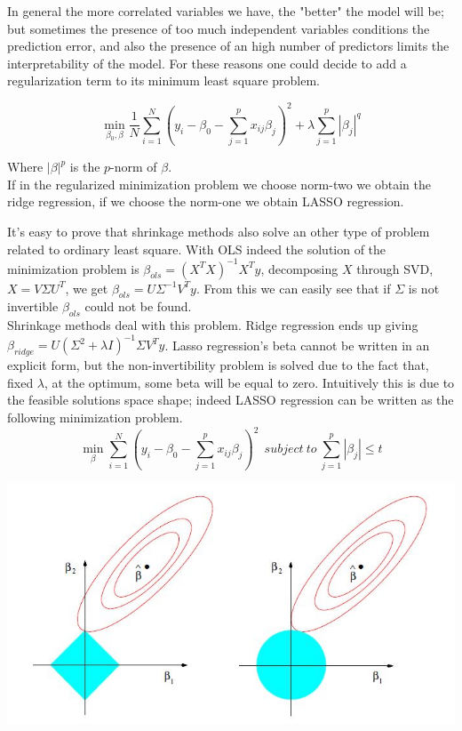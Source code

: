 \documentclass{article}%
\begin{document}
In general the more correlated variables we have, the "better" the model will be; but sometimes the presence of too much independent variables conditions the prediction error, and also the presence of an high number of predictors limits the interpretability of the model. For these reasons one could decide to add a regularization term to its minimum least square problem.

\[
\min_{\beta_0 , \beta} \frac{1}{N} \sum_{i=1}^N (y_i-\beta_0 - \sum_{j=1}^p x_{ij}\beta_j)^2 + \lambda\sum_{j=1}^p |\beta_j |^q 
\]

Where $|\beta|^p$ is the $p$-norm of $\beta$.
\\

If in the regularized minimization problem we choose norm-two we obtain the ridge regression, if we choose the norm-one we obtain LASSO regression. 


It's easy to prove that shrinkage methods also solve an other type of problem related to ordinary least square. With OLS indeed the solution of the minimization problem is $ \beta_{ols}=(X^TX)^{-1}X^Ty$, decomposing $X$ through SVD, $X=V\Sigma U^T$, we get $\beta_{ols}=U\Sigma^{-1}V^Ty$. From this we can easily see that if $\Sigma$ is not invertible $\beta_{ols}$ could not be found.
\\

Shrinkage methods deal with this problem. Ridge regression ends up giving $\beta_{ridge}=U(\Sigma^2+\lambda I)^{-1} \Sigma V^T y$. Lasso regression's beta cannot be written in an explicit form, but the non-invertibility problem is solved due to the fact that, fixed $\lambda$, at the optimum, some beta will be equal to zero. Intuitively this is due to the feasible solutions space shape; indeed LASSO regression can be written as the following minimization problem.
\begin{equation}
 \min_{\beta} \sum_{i=1}^N ( y_i -\beta_0 -\sum_{j=1}^p x_{ij} \beta_j)^2 ~~subject~to~\sum_{j=1}^p |\beta_j| \leq t
\end{equation}

\includegraphics[scale=0.75]{lasso}
\end{document}
